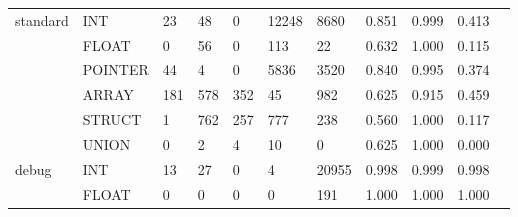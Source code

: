 \begin{table*}[t]
\begin{tabular}{lp{1.2cm}p{1.2cm}p{1.2cm}p{1.2cm}p{1.2cm}p{1.2cm}p{1.2cm}p{1.2cm}p{1.2cm}p{1.2cm}}
\cline{1-10}
\multirow{6}{*}{standard} & INT &                                 23 &                                48 &                                0 &                             12248 &                            8680 &                           0.851 &                                  0.999 &                                0.413 \\
      & FLOAT &                                  0 &                                56 &                                0 &                               113 &                              22 &                           0.632 &                                  1.000 &                                0.115 \\
      & POINTER &                                 44 &                                 4 &                                0 &                              5836 &                            3520 &                           0.840 &                                  0.995 &                                0.374 \\
      & ARRAY &                                181 &                               578 &                              352 &                                45 &                             982 &                           0.625 &                                  0.915 &                                0.459 \\
      & STRUCT &                                  1 &                               762 &                              257 &                               777 &                             238 &                           0.560 &                                  1.000 &                                0.117 \\
      & UNION &                                  0 &                                 2 &                                4 &                                10 &                               0 &                           0.625 &                                  1.000 &                                0.000 \\
\cline{1-10}
\multirow{6}{*}{debug} & INT &                                 13 &                                27 &                                0 &                                 4 &                           20955 &                           0.998 &                                  0.999 &                                0.998 \\
      & FLOAT &                                  0 &                                 0 &                                0 &                                 0 &                             191 &                           1.000 &                                  1.000 &                                1.000 \\

\end{tabular}
\end{table*}
